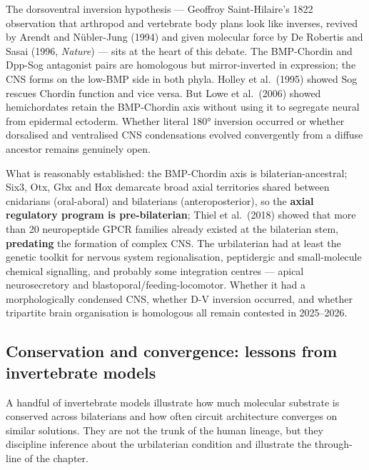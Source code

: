 The dorsoventral inversion hypothesis --- Geoffroy Saint-Hilaire's 1822 observation that arthropod and vertebrate body plans look like inverses, revived by Arendt and Nübler-Jung (1994) and given molecular force by De Robertis and Sasai (1996, \emph{Nature}) --- sits at the heart of this debate. The BMP-Chordin and Dpp-Sog antagonist pairs are homologous but mirror-inverted in expression; the CNS forms on the low-BMP side in both phyla. Holley et al.~(1995) showed Sog rescues Chordin function and vice versa. But Lowe et al.~(2006) showed hemichordates retain the BMP-Chordin axis without using it to segregate neural from epidermal ectoderm. Whether literal 180° inversion occurred or whether dorsalised and ventralised CNS condensations evolved convergently from a diffuse ancestor remains genuinely open.

What is reasonably established: the BMP-Chordin axis is bilaterian-ancestral; Six3, Otx, Gbx and Hox demarcate broad axial territories shared between cnidarians (oral-aboral) and bilaterians (anteroposterior), so the \textbf{axial regulatory program is pre-bilaterian}; Thiel et al.~(2018) showed that more than 20 neuropeptide GPCR families already existed at the bilaterian stem, \textbf{predating} the formation of complex CNS. The urbilaterian had at least the genetic toolkit for nervous system regionalisation, peptidergic and small-molecule chemical signalling, and probably some integration centres --- apical neurosecretory and blastoporal/feeding-locomotor. Whether it had a morphologically condensed CNS, whether D-V inversion occurred, and whether tripartite brain organisation is homologous all remain contested in 2025--2026.

\subsection{Conservation and convergence: lessons from invertebrate models}\label{04_urbilateria-conservation-and-convergence-lessons-from-invertebrate-models}

A handful of invertebrate models illustrate how much molecular substrate is conserved across bilaterians and how often circuit architecture converges on similar solutions. They are not the trunk of the human lineage, but they discipline inference about the urbilaterian condition and illustrate the through-line of the chapter.

